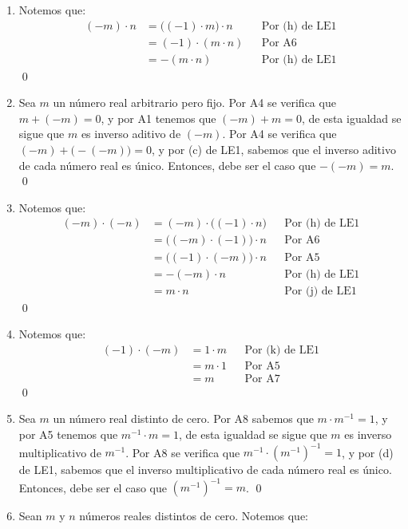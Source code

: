 \documentclass[11pt]{article}
\begin{document}
\begin{enumerate}[label=\alph*)]
    \item Notemos que:
    \begin{align*}
        (-m) \cdot n &= \bigl( \left(-1 \right) \cdot m \bigr) \cdot n && \text{Por (h) de LE1}\\
        &= (-1) \cdot (m \cdot n) && \text{Por A6}\\
        &= -(m \cdot n) && \text{Por (h) de LE1}
    \end{align*} \qed
    \item Sea $m$ un número real arbitrario pero fijo. Por A4 se verifica que $m + (-m) = 0$, y por A1 tenemos que $(-m) + m = 0$, de esta igualdad se sigue que $m$ es inverso aditivo de $(-m)$. Por A4 se verifica que $(-m) + \bigl(-(-m)\bigr) = 0$, y por (c) de LE1, sabemos que el inverso aditivo de cada número real es único. Entonces, debe ser el caso que $-(-m) = m$. \qed
    \item Notemos que:
    \begin{align*}
        (-m) \cdot (-n) &= (-m) \cdot \bigl( (-1) \cdot n \bigr) && \text{Por (h) de LE1}\\
        &= \bigl( (-m) \cdot (-1) \bigr) \cdot n && \text{Por A6}\\
        &= \bigl( (-1) \cdot (-m) \bigr) \cdot n && \text{Por A5}\\
        &= -(-m) \cdot n && \text{Por (h) de LE1}\\
        &= m \cdot n && \text{Por (j) de LE1}
    \end{align*} \qed
    \item Notemos que:
    \begin{align*}
        (-1) \cdot (-m) &= 1 \cdot m && \text{Por (k) de LE1}\\
        &= m \cdot 1 && \text{Por A5}\\
        &= m && \text{Por A7}
    \end{align*} \qed
    \item Sea $m$ un número real distinto de cero. Por A8 sabemos que $m \cdot m^{-1}=1$, y por A5 tenemos que $m^{-1} \cdot m=1$, de esta igualdad se sigue que $m$ es inverso multiplicativo de $m^{-1}$. Por A8 se verifica que $ m^{-1} \cdot \left( m^{-1} \right)^{-1} =1$, y por (d) de LE1, sabemos que el inverso multiplicativo de cada número real es único. Entonces, debe ser el caso que $\left( m^{-1} \right )^{-1}=m$. \qed
    \item Sean $m$ y $n$ números reales distintos de cero. Notemos que:
    \begin{align*}

\end{align*}
\end{enumerate}
\end{document}
